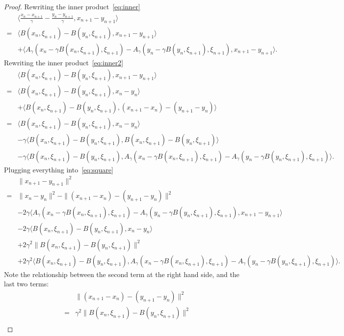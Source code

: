 \documentclass{article}
\newcommand{\1}{\mathbbm 1}
\newcommand{\ps}[1]{\langle #1 \rangle}
\theoremstyle{definition}
\begin{document}
\begin{proof}
Rewriting the inner product~\eqref{eq:inner}
\begin{align}
&\ps{\frac{x_n - x_{n+1}}{\gamma} - \frac{y_n - y_{n+1}}{\gamma}, x_{n+1} - y_{n+1}} \nonumber\\
= & \ps{B(x_n,\xi_{n+1}) - B(y_n,\xi_{n+1}), x_{n+1} - y_{n+1}} 
\label{eq:inner2}\\
&+  \ps{A_\gamma(x_n - \gamma B(x_n,\xi_{n+1}),\xi_{n+1}) - A_\gamma(y_n - \gamma B(y_n,\xi_{n+1}),\xi_{n+1}), x_{n+1} - y_{n+1}}\nonumber.
\end{align}
Rewriting the inner product~\eqref{eq:inner2}
\begin{align*}
    &\ps{B(x_n,\xi_{n+1}) - B(y_n,\xi_{n+1}), x_{n+1} - y_{n+1}} \\
    =& \ps{B(x_n,\xi_{n+1}) - B(y_n,\xi_{n+1}), x_{n} - y_{n}} \\
    &+ \ps{B(x_n,\xi_{n+1}) - B(y_n,\xi_{n+1}), (x_{n+1}-x_n) - (y_{n+1}-y_n)}\\
    =& \ps{B(x_n,\xi_{n+1}) - B(y_n,\xi_{n+1}), x_{n} - y_{n}} \\
    &-\gamma \ps{B(x_n,\xi_{n+1}) - B(y_n,\xi_{n+1}), B(x_n,\xi_{n+1}) - B(y_n,\xi_{n+1})}\\
    &-\gamma \ps{B(x_n,\xi_{n+1}) - B(y_n,\xi_{n+1}), A_\gamma(x_n - \gamma B(x_n,\xi_{n+1}),\xi_{n+1}) - A_\gamma(y_n - \gamma B(y_n,\xi_{n+1}),\xi_{n+1})}.
\end{align*}
Plugging everything into~\eqref{eq:square}
\begin{align*}
    &\|x_{n+1} - y_{n+1}\|^2 \\
    = &\|x_{n} - y_n\|^2 - \|(x_{n+1} - x_n) - (y_{n+1} - y_n)\|^2 \\
    &-2\gamma \ps{A_\gamma(x_n - \gamma B(x_n,\xi_{n+1}),\xi_{n+1}) - A_\gamma(y_n - \gamma B(y_n,\xi_{n+1}),\xi_{n+1}), x_{n+1} - y_{n+1}}\\
    &-2\gamma\ps{B(x_n,\xi_{n+1}) - B(y_n,\xi_{n+1}), x_{n} - y_{n}}\\
    &+2\gamma^2 \|B(x_n,\xi_{n+1}) - B(y_n,\xi_{n+1})\|^2\\
    &+2\gamma^2 \ps{B(x_n,\xi_{n+1}) - B(y_n,\xi_{n+1}), A_\gamma(x_n - \gamma B(x_n,\xi_{n+1}),\xi_{n+1}) - A_\gamma(y_n - \gamma B(y_n,\xi_{n+1}),\xi_{n+1})}.
\end{align*}
Note the relationship between the second term at the right hand side, and the last two terms:
\begin{align}
    &\|(x_{n+1} - x_n) - (y_{n+1} - y_n)\|^2 \\
    =&\gamma^2 \|B(x_n,\xi_{n+1}) - B(y_n,\xi_{n+1})\|^2\\

\end{align}
\end{proof}
\end{document}
